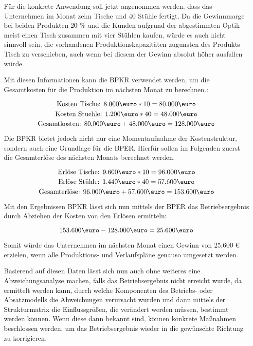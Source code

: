 Für die konkrete Anwendung soll jetzt angenommen werden, dass das Unternehmen im Monat zehn Tische und 40 Stühle fertigt. Da die Gewinnmarge bei beiden Produkten 20 \% und die Kunden aufgrund der abgestimmten Optik meist einen Tisch zusammen mit vier Stühlen kaufen, würde es auch nicht sinnvoll sein, die vorhandenen Produktionskapazitäten zugunsten des Produkts Tisch zu verschieben, auch wenn bei diesem der Gewinn absolut höher ausfallen würde.

Mit diesen Informationen kann die BPKR verwendet werden, um die Gesamtkosten für die Produktion im nächsten Monat zu berechnen.:

\[ \text{Kosten Tische: } 8.000 \text{\euro} * 10 = 80.000 \text{\euro} \]
\[ \text{Kosten Stuehle: } 1.200 \text{\euro} * 40 = 48.000 \text{\euro} \]
\[ \text{Gesamtkosten: } 80.000 \text{\euro} + 48.000 \text{\euro} = 128.000 \text{\euro} \]

Die BPKR bietet jedoch nicht nur eine Momentaufnahme der Kostenstruktur, sondern auch eine Grundlage für die BPER. Hierfür sollen im Folgenden zuerst die Gesamterlöse des nächsten Monats berechnet werden.

\[ \text{Erlöse Tische: } 9.600 \text{\euro} * 10 = 96.000 \text{\euro} \]
\[ \text{Erlöse Stühle: } 1.440 \text{\euro} * 40 = 57.600 \text{\euro} \]
\[ \text{Gesamterlöse: } 96.000 \text{\euro} + 57.600 \text{\euro} = 153.600 \text{\euro} \]

Mit den Ergebnissen BPKR lässt sich nun mittels der BPER das Betriebsergebnis durch Abziehen der Kosten von den Erlösen ermitteln:

\[ 153.600 \text{\euro} - 128.000 \text{\euro} = 25.600 \text{\euro} \]

Somit würde das Unternehmen im nächsten Monat einen Gewinn von 25.600 {\euro} erzielen, wenn alle Produktions- und Verlaufspläne genauso umgesetzt werden.

Basierend auf diesen Daten lässt sich nun auch ohne weiteres eine Abweichungsanalyse machen, falls das Betriebsergebnis nicht erreicht wurde, da ermittelt werden kann, durch welche Komponenten des Betriebs- oder Absatzmodells die Abweichungen verursacht wurden und dann mittels der Strukturmatrix die Einflussgrö{\ss}en, die verändert werden müssen, bestimmt werden können. Wenn diese dann bekannt sind, können konkrete Ma{\ss}nahmen beschlossen werden, um das Betriebsergebnis wieder in die gewünschte Richtung zu korrigieren.